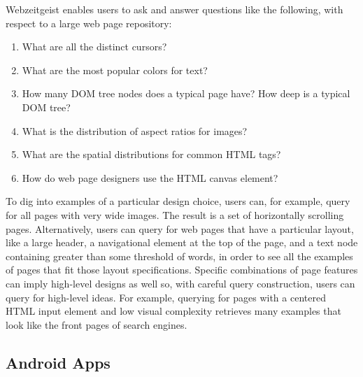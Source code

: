 Webzeitgeist enables users to ask and answer questions like the following, with respect to a large web page repository:
\begin{enumerate}
\item    What are all the distinct cursors?
\item    What are the most popular colors for text?
\item    How many DOM tree nodes does a typical page have? How deep is a typical DOM tree?
\item    What is the distribution of aspect ratios for images?
\item    What are the spatial distributions for common HTML tags?
\item    How do web page designers use the HTML canvas element?
\end{enumerate}

To dig into examples of a particular design choice, users can, for example, query for all pages with very wide images. The result is a set of horizontally scrolling pages. Alternatively, users can query for web pages that have a particular layout, like a large header, a navigational element at the top of the page, and a text node containing greater than some threshold of words, in order to see all the examples of pages that fit those layout specifications. Specific combinations of page features can imply high-level designs as well so, with careful query construction, users can query for high-level ideas. For example, querying for pages with a centered HTML input element and low visual complexity retrieves many examples that look like the front pages of search engines.

\subsection{Android Apps}

